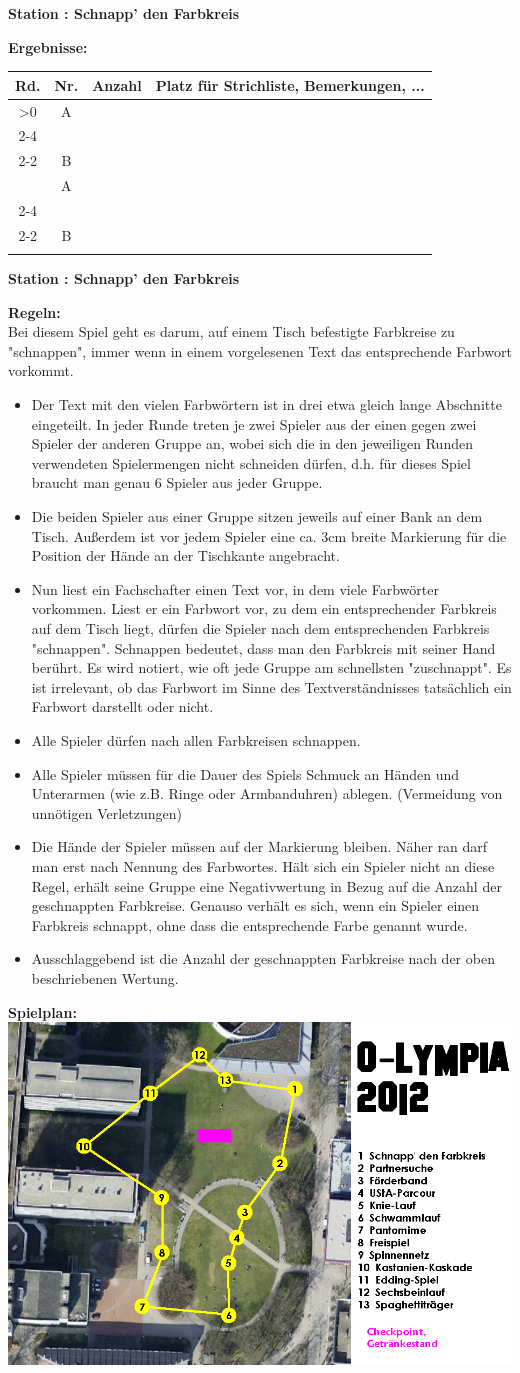 \documentclass{scrartcl}
\newcommand{\replicate}[2]{\ifnum#1>0 #2
	\expandafter\replicate\expandafter{\number\numexpr#1-1}{#2}\fi}
\newcommand{\modulo}[2]{#1-((#1+#2)/#2-1)*#2}
\newcounter{station}\setcounter{station}{1}
\newcounter{ctrA}
\newcounter{ctrB}
\newcounter{currentRow}
\newcounter{noOfStations}\setcounter{noOfStations}{13}
\newenvironment{stationsheet}[3]
{\begin{center} \textbf{\huge Station \arabic{station}: #1}\\[2em]\end{center}
\textbf{\Large Ergebnisse:}\\[1em]
\setcounter{ctrA}{\value{station}}
\setcounter{ctrB}{\value{station}}
\setcounter{currentRow}{1}
\begin{tabular}{|c|c|p{3cm}|p{11cm}|}
\hline
\textbf{Rd.} & \textbf{Nr.} & \textbf{#2} & \textbf{Platz für Strichliste, Bemerkungen, ...}\\ \hline
\replicate{\value{noOfStations}}
{
\multirow{2}{*}{\arabic{currentRow}} & A\arabic{ctrA} & &
\ifthenelse{#3=0}{\\ \cline{2-4}}{\\ \cline{2-2}}
 & B\arabic{ctrB} & & \stepcounter{currentRow}
\setcounter{ctrA}{1+\modulo{\value{ctrA}-2}{\value{noOfStations}}}
\setcounter{ctrB}{1+\modulo{\value{ctrB}}{\value{noOfStations}}}
\\ \hline
}
\end{tabular}
\clearpage
\begin{center}\textbf{\huge Station \arabic{station}: #1}\\[1em]\end{center}
\textbf{\Large Regeln:}\\[1em]
}
{
\textbf{\Large Spielplan:}\\[1em]
\includegraphics[scale=0.53]{spielplan_klein.png}
\addtocounter{station}{1}
\clearpage
}
\begin{document}
\begin{stationsheet}{Schnapp' den Farbkreis}{Anzahl}{0}
Bei diesem Spiel geht es darum, auf einem Tisch befestigte Farbkreise zu "schnappen", immer wenn in einem vorgelesenen Text das entsprechende Farbwort vorkommt.
\begin{itemize}
\item Der Text mit den vielen Farbwörtern ist in drei etwa gleich lange Abschnitte eingeteilt. In jeder Runde treten je zwei Spieler aus der einen gegen zwei Spieler der anderen Gruppe an, wobei sich die in den jeweiligen Runden verwendeten Spielermengen nicht schneiden dürfen, d.h. für dieses Spiel braucht man genau 6 Spieler aus jeder Gruppe. \item Die beiden Spieler aus einer Gruppe sitzen jeweils auf einer Bank an dem Tisch. Außerdem ist vor jedem Spieler eine ca. 3cm breite Markierung für die Position der Hände an der Tischkante angebracht.
\item Nun liest ein Fachschafter einen Text vor, in dem viele Farbwörter vorkommen. Liest er ein Farbwort vor, zu dem ein entsprechender Farbkreis auf dem Tisch liegt, dürfen die Spieler nach dem entsprechenden Farbkreis "schnappen". Schnappen bedeutet, dass man den Farbkreis mit seiner Hand berührt. Es wird notiert, wie oft jede Gruppe am schnellsten "zuschnappt". Es ist irrelevant, ob das Farbwort im Sinne des Textverständnisses tatsächlich ein Farbwort darstellt oder nicht.
\item Alle Spieler dürfen nach allen Farbkreisen schnappen.
\item Alle Spieler müssen für die Dauer des Spiels Schmuck an Händen und Unterarmen (wie z.B. Ringe oder Armbanduhren) ablegen. (Vermeidung von unnötigen Verletzungen)
\item Die Hände der Spieler müssen auf der Markierung bleiben. Näher ran darf man erst nach Nennung des Farbwortes. Hält sich ein Spieler nicht an diese Regel, erhält seine Gruppe eine Negativwertung in Bezug auf die Anzahl der geschnappten Farbkreise. Genauso verhält es sich, wenn ein Spieler einen Farbkreis schnappt, ohne dass die entsprechende Farbe genannt wurde.
\item Ausschlaggebend ist die Anzahl der geschnappten Farbkreise nach der oben beschriebenen Wertung.
\end{itemize}
\end{stationsheet}
\end{document}

